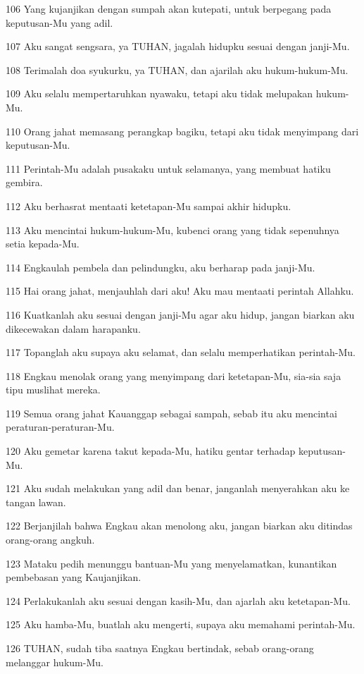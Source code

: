 \par 106 Yang kujanjikan dengan sumpah akan kutepati, untuk berpegang pada keputusan-Mu yang adil.
\par 107 Aku sangat sengsara, ya TUHAN, jagalah hidupku sesuai dengan janji-Mu.
\par 108 Terimalah doa syukurku, ya TUHAN, dan ajarilah aku hukum-hukum-Mu.
\par 109 Aku selalu mempertaruhkan nyawaku, tetapi aku tidak melupakan hukum-Mu.
\par 110 Orang jahat memasang perangkap bagiku, tetapi aku tidak menyimpang dari keputusan-Mu.
\par 111 Perintah-Mu adalah pusakaku untuk selamanya, yang membuat hatiku gembira.
\par 112 Aku berhasrat mentaati ketetapan-Mu sampai akhir hidupku.
\par 113 Aku mencintai hukum-hukum-Mu, kubenci orang yang tidak sepenuhnya setia kepada-Mu.
\par 114 Engkaulah pembela dan pelindungku, aku berharap pada janji-Mu.
\par 115 Hai orang jahat, menjauhlah dari aku! Aku mau mentaati perintah Allahku.
\par 116 Kuatkanlah aku sesuai dengan janji-Mu agar aku hidup, jangan biarkan aku dikecewakan dalam harapanku.
\par 117 Topanglah aku supaya aku selamat, dan selalu memperhatikan perintah-Mu.
\par 118 Engkau menolak orang yang menyimpang dari ketetapan-Mu, sia-sia saja tipu muslihat mereka.
\par 119 Semua orang jahat Kauanggap sebagai sampah, sebab itu aku mencintai peraturan-peraturan-Mu.
\par 120 Aku gemetar karena takut kepada-Mu, hatiku gentar terhadap keputusan-Mu.
\par 121 Aku sudah melakukan yang adil dan benar, janganlah menyerahkan aku ke tangan lawan.
\par 122 Berjanjilah bahwa Engkau akan menolong aku, jangan biarkan aku ditindas orang-orang angkuh.
\par 123 Mataku pedih menunggu bantuan-Mu yang menyelamatkan, kunantikan pembebasan yang Kaujanjikan.
\par 124 Perlakukanlah aku sesuai dengan kasih-Mu, dan ajarlah aku ketetapan-Mu.
\par 125 Aku hamba-Mu, buatlah aku mengerti, supaya aku memahami perintah-Mu.
\par 126 TUHAN, sudah tiba saatnya Engkau bertindak, sebab orang-orang melanggar hukum-Mu.
